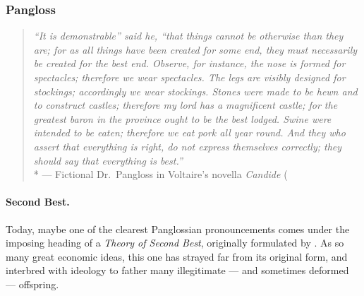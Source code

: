 
\subsubsection{Pangloss}
	\label{sec:Pangloss}

\begin{quotation}
	\emph{``It is demonstrable'' said he, ``that things cannot be otherwise than they are;
for as all things have been created for some end, they must necessarily be created for the best end.
	Observe, for instance, the nose is formed for spectacles;
therefore we wear spectacles.
	The legs are visibly designed for stockings;
accordingly we wear stockings.
	Stones were made to be hewn and to construct castles;
therefore my lord has a magnificent castle;
for the greatest baron in the province ought to be the best lodged.
	Swine were intended to be eaten;
therefore we eat pork all year round.
And they who assert that everything is right, do not express themselves correctly;
they should say that everything is best.''}
	\\*
	--- Fictional Dr.\ Pangloss in Voltaire's novella \emph{Candide} (\citeyearpar[loc.~125]{Voltaire1759}
\end{quotation}

\paragraph{Second Best.}
Today, maybe one of the clearest Panglossian pronouncements comes under the imposing heading of a \emph{Theory of Second Best}, originally formulated by \cite{Lancaster1956}.
As so many great economic ideas, this one has strayed far from its original form, and interbred with ideology to father many illegitimate --- and sometimes  deformed --- offspring.

